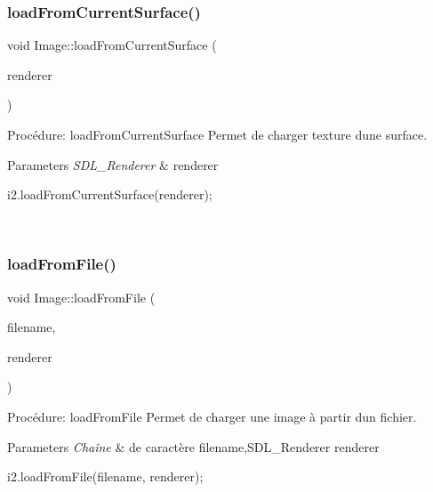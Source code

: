 \subsubsection{\texorpdfstring{load\+From\+Current\+Surface()}{loadFromCurrentSurface()}}
{\footnotesize\ttfamily void Image\+::load\+From\+Current\+Surface (\begin{DoxyParamCaption}\item[{S\+D\+L\+\_\+\+Renderer $\ast$}]{renderer }\end{DoxyParamCaption})}



Procédure\+: load\+From\+Current\+Surface Permet de charger texture d\textquotesingle{}une surface. 


\begin{DoxyParams}{Parameters}
{\em S\+D\+L\+\_\+\+Renderer} & renderer 
\begin{DoxyCode}
i2.loadFromCurrentSurface(renderer);
\end{DoxyCode}
 \\
\hline
\end{DoxyParams}
\mbox{\label{classImage_aa276b5183099671ddeaf8f083068046c}} 
\subsubsection{\texorpdfstring{load\+From\+File()}{loadFromFile()}}
{\footnotesize\ttfamily void Image\+::load\+From\+File (\begin{DoxyParamCaption}\item[{const char $\ast$}]{filename,  }\item[{S\+D\+L\+\_\+\+Renderer $\ast$}]{renderer }\end{DoxyParamCaption})}



Procédure\+: load\+From\+File Permet de charger une image à partir d\textquotesingle{}un fichier. 


\begin{DoxyParams}{Parameters}
{\em Chaîne} & de caractère filename,S\+D\+L\+\_\+\+Renderer renderer 
\begin{DoxyCode}
i2.loadFromFile(filename, renderer);
\end{DoxyCode}
 \\
\hline
\end{DoxyParams}
\mbox{\label{classImage_a833f5d3b4b9f905320c6dffcc9b84b95}} 
